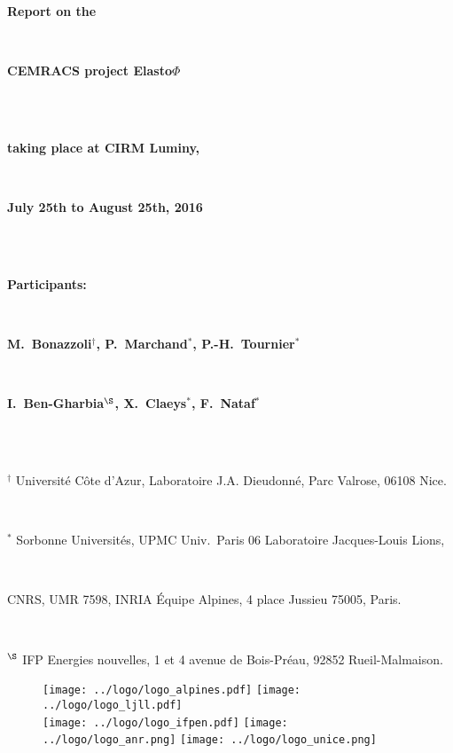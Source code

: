 

\thispagestyle{empty}

\centerline{\textbf{\huge Report on the}}
\quad\\[5pt]
\centerline{\textbf{\huge CEMRACS project Elasto$\Phi$}}
\quad\\[5pt]
\vspace{1cm}
\quad\\
\centerline{\textbf{\Large taking place at CIRM Luminy,}}\quad\\[5pt]
\centerline{\textbf{\Large July 25th to August 25th, 2016}}\quad\\[5pt]
\vspace{1cm}
\quad\\
\centerline{\textbf{\Large Participants:}}\quad\\[15pt]
\centerline{\textbf{\Large M.~Bonazzoli$^{\dagger}$, P.~Marchand$^{*}$, P.-H.~Tournier$^{*}$}}\quad\\[5pt]
\centerline{\textbf{\Large I.~Ben-Gharbia$^{\S}$, X.~Claeys$^{*}$, F.~Nataf$^{*}$}}\quad\\[5pt]
\vspace{0.25cm}\quad\\
\centerline{$^{\dagger}$ Universit\'e C\^ote d'Azur, Laboratoire J.A. Dieudonn\'e, Parc Valrose, 06108 Nice.}\,\\
\centerline{$^{*}$ Sorbonne Universit\'es, UPMC Univ.~Paris 06 Laboratoire Jacques-Louis Lions,}\,\\
\centerline{CNRS, UMR 7598, INRIA \'Equipe Alpines, 4 place Jussieu 75005, Paris.}\,\\
\centerline{$^{\S}$ IFP Energies nouvelles, 1 et 4 avenue de Bois-Pr\'eau, 92852 Rueil-Malmaison.}



\vspace{2cm}
\begin{figure}[h!]

\hspace{2.25cm}\texttt{[image: ../logo/logo\_alpines.pdf]}
\hspace{0.5cm}\texttt{[image: ../logo/logo\_ljll.pdf]}\\[10pt]

\hspace{0.5cm}\texttt{[image: ../logo/logo\_ifpen.pdf]}
\hspace{0.5cm}\texttt{[image: ../logo/logo\_anr.png]}
\hspace{0.5cm}\texttt{[image: ../logo/logo\_unice.png]}

\end{figure}

